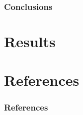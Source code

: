 \documentclass{beamer}
\newcommand{\linespace}{\vskip 0.25cm}
\begin{document}
\begin{frame}
\frametitle{Conclusions}
	
	
\end{frame}


\section[Results]{Results}



\section*{References}

\begin{frame} 
	\frametitle{References} 
%	
%	
%	
%  
%	
\end{frame} 
\end{document}
